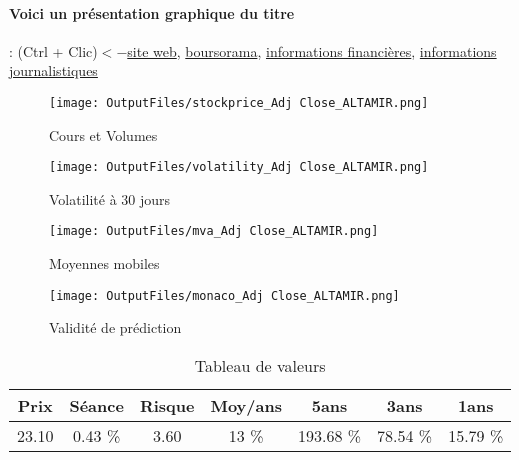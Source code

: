 \documentclass[11pt,a4paper]{report}%
\begin{document}
\paragraph{Voici un présentation graphique du titre} : (Ctrl + Clic)$<-$\href{https://www.altamir.fr/fr/actionnaires-investisseurs/pourquoi-investir/}{site web}, \href{https://www.boursorama.com/cours/1rPLTA}{boursorama}, \href{https://www.qwant.com/?q=site:https:%2f%2fwww.easybourse.com%2faction-societe%2fALTAMIR&t=web&client=ext-firefox-hp}{informations financières}, \href{https://bourse.lerevenu.com/cours-de-bourse/fiche-valeur-synthese/ALTAMIR/LTA-FR}{informations journalistiques}
\begin{figure}[!htb]
   \begin{minipage}{0.5\textwidth}
     \centering
     \texttt{[image: OutputFiles/stockprice\_Adj Close\_ALTAMIR.png]}
     \caption{Cours et Volumes}\label{Fig:price_ALTAMIR}
   \end{minipage}\hfill
   \begin{minipage}{0.5\textwidth}
     \centering
     \texttt{[image: OutputFiles/volatility\_Adj Close\_ALTAMIR.png]}
     \caption{Volatilité à 30 jours}\label{Fig:volat_ALTAMIR}
   \end{minipage}
\end{figure}
\begin{figure}[!htb]
   \begin{minipage}{0.5\textwidth}
     \centering
     \texttt{[image: OutputFiles/mva\_Adj Close\_ALTAMIR.png]}
     \caption{Moyennes mobiles}\label{Fig:mva_ALTAMIR}
   \end{minipage}\hfill
   \begin{minipage}{0.5\textwidth}
     \centering
     \texttt{[image: OutputFiles/monaco\_Adj Close\_ALTAMIR.png]}
     \caption{Validité de prédiction}\label{Fig:prediction_ALTAMIR}
   \end{minipage}
\end{figure}

\begin{table}[H]
  \centering
    \begin{tabular}{|c|c|c|c|c|c|c|}
    \hline
    Prix & Séance & Risque  & Moy/ans & 5ans & 3ans & 1ans \\
    \hline
    23.10 &    0.43 \%    & 3.60 & 13 \% & 193.68 \% & 78.54 \% & 15.79 \% \\
    \hline
    \end{tabular}%
        \label{tab:table_ALTAMIR}%
      \caption{Tableau de valeurs}
\end{table}%
\end{document}

